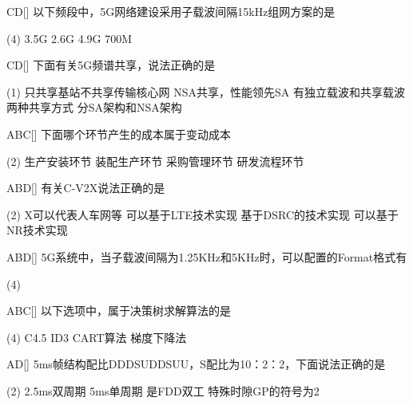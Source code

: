 \begin{choice}{\;CD\;}[]
	以下频段中，5G网络建设采用子载波间隔15kHz组网方案的是
	\begin{tasks}(4)
		\task3.5G
		\task 2.6G
		\task 4.9G
		\task 700M
	\end{tasks}
\end{choice}

\begin{choice}{\;CD\;}[]
	下面有关5G频谱共享，说法正确的是
	\begin{tasks}(1)
		\task 只共享基站不共享传输核心网
		\task NSA共享，性能领先SA
		\task 有独立载波和共享载波两种共享方式
		\task 分SA架构和NSA架构
	\end{tasks}
\end{choice}

\begin{choice}{\;ABC\;}[]
	下面哪个环节产生的成本属于变动成本
	\begin{tasks}(2)
		\task 生产安装环节
		\task 装配生产环节
		\task 采购管理环节
		\task 研发流程环节
	\end{tasks}
\end{choice}

\begin{choice}{\;ABD\;}[]
	有关C-V2X说法正确的是
	\begin{tasks}(2)
		\task X可以代表人车网等
		\task 可以基于LTE技术实现
		\task  基于DSRC的技术实现
		\task 可以基于NR技术实现
	\end{tasks}
\end{choice}

\begin{choice}{\;ABD\;}[]
	5G系统中，当子载波间隔为1.25KHz和5KHz时，可以配置的Format格式有
	\begin{tasks}(4)
	\end{tasks}
\end{choice}
\begin{choice}{\;ABC\;}[]
	以下选项中，属于决策树求解算法的是
	\begin{tasks}(4)
		\task  C4.5
		\task ID3
		\task CART算法
		\task 梯度下降法
	\end{tasks}
\end{choice}

\begin{choice}{\;AD\;}[]
	5ms帧结构配比DDDSUDDSUU，S配比为10：2：2，下面说法正确的是
	\begin{tasks}(2)
		\task 2.5ms双周期
		\task 5ms单周期
		\task 是FDD双工
		\task 特殊时隙GP的符号为2
	\end{tasks}
\end{choice}

